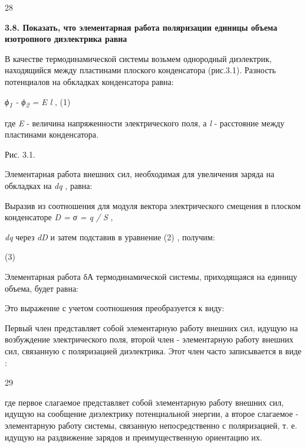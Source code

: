 28

\textbf{3.8. Показать, что элементарная работа поляризации единицы
объема изотропного диэлектрика равна}

\solving{}

В качестве термодинамической системы возьмем однородный диэлектрик,
находящийся между пластинами плоского конденсатора (рис.3.1). Разность
потенциалов на обкладках конденсатора равна:

\emph{ϕ\textsubscript{1} - ϕ\textsubscript{2} = E l} , (1)

где \emph{E} - величина напряженности электрического поля, а \emph{l} -
расстояние между пластинами конденсатора.


Рис. 3.1.

Элементарная работа внешних сил, необходимая для увеличения заряда на
обкладках на \emph{dq} , равна:


Выразив из соотношения для модуля вектора электрического смещения в
плоском конденсаторе \emph{D = σ = q / S} ,

\emph{dq} через \emph{dD} и затем подставив в уравнение (2) , получим:

(3)

Элементарная работа δА термодинамической системы, приходящаяся на
единицу объема, будет равна:


Это выражение с учетом соотношения %
преобразуется к виду: %

Первый член представляет собой элементарную работу внешних сил, идущую
на возбуждение электрического поля, второй член - элементарную работу
внешних сил, связанную с поляризацией диэлектрика. Этот член часто
записывается в виде :


29

где первое слагаемое представляет собой элементарную работу внешних сил,
идущую на сообщение диэлектрику потенциальной энергии, а второе
слагаемое - элементарную работу системы, связанную непосредственно с
поляризацией, т. е. идущую на раздвижение зарядов и преимущественную
ориентацию их.

